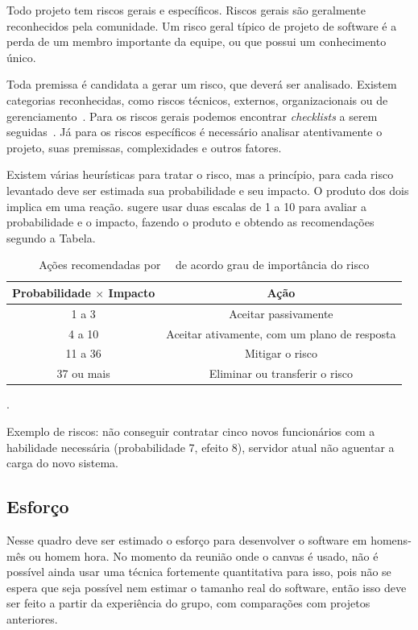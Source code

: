 \documentclass[a4]{report}
\begin{document}
Todo projeto tem riscos gerais e específicos. Riscos gerais são geralmente reconhecidos pela comunidade. Um risco geral típico de projeto de software é a perda de um membro importante da equipe, ou que possui um conhecimento único.


Toda premissa é candidata a gerar um risco, que deverá ser analisado. Existem categorias reconhecidas, como riscos técnicos, externos, organizacionais ou de gerenciamento~\citep{pmbok:6}.
Para os riscos gerais podemos encontrar \textit{checklists} a serem seguidas~\citep{radical:proj:man}. Já para os riscos específicos é necessário analisar atentivamente o projeto, suas premissas, complexidades e outros fatores.

Existem várias heurísticas para tratar o risco, mas a princípio, para cada risco levantado deve ser estimada sua probabilidade e seu impacto. O produto dos dois implica em uma reação. \citet{finocchio:2013} sugere usar duas escalas de 1 a 10 para avaliar a probabilidade e o impacto, fazendo o produto e obtendo as recomendações segundo a Tabela.

\begin{table}[hbt]
    \centering
    \begin{tabular}{cc}
    \toprule
     Probabilidade $\times$ Impacto    &  Ação  \\
     \midrule
         1 a 3  & Aceitar passivamente \\
         4 a 10 & Aceitar ativamente, com um plano de resposta \\
         11 a 36 & Mitigar o risco \\
         37 ou mais & Eliminar ou transferir o risco \\
    \bottomrule
    \end{tabular}
    \caption{Ações recomendadas por~~\citep{finocchio:2013} de acordo grau de importância do risco}.
    \label{tab:risco}
\end{table}

Exemplo de riscos: não conseguir contratar cinco novos funcionários com a habilidade necessária (probabilidade 7, efeito 8), servidor atual não aguentar a carga do novo sistema.

\subsection{Esforço}

Nesse quadro deve ser estimado o esforço para desenvolver o software em homens-mês ou homem hora. No momento da reunião onde o canvas é usado, não é possível ainda usar uma técnica fortemente quantitativa para isso, pois não se espera que seja possível nem estimar o tamanho real do software, então isso deve ser feito a partir da experiência do grupo, com comparações com projetos anteriores.
\end{document}
